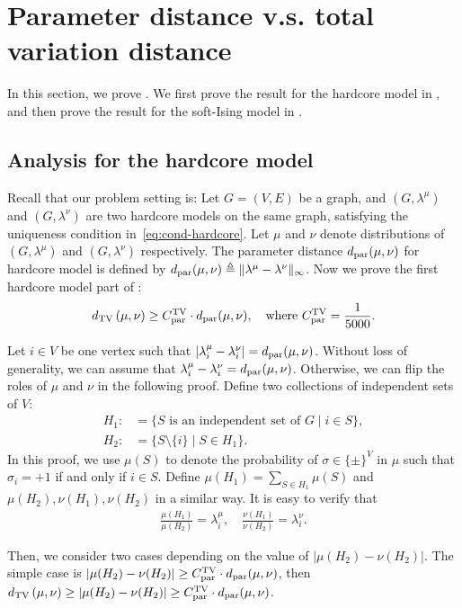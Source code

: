 \section{Parameter distance v.s. total variation distance}\label{sec:lower}
In this section, we prove . We first prove the result for the hardcore model in , and then prove the result for the soft-Ising model in . 
\subsection{Analysis for the hardcore model}\label{sec:hardcore-proof}
Recall that our problem setting is: Let $G=(V,E)$ be a graph, and $(G,\lambda^\mu)$ and $(G,\lambda^\nu)$ are two hardcore models on the same graph, satisfying the uniqueness condition in~\eqref{eq:cond-hardcore}. Let $\mu$ and $\nu$ denote distributions of $(G,\lambda^\mu)$ and $(G,\lambda^\nu)$ respectively. The parameter distance $d_\mathrm{par}(\mu,\nu)$ for hardcore model is defined by $d_\mathrm{par}(\mu,\nu) \triangleq \Vert \lambda^\mu - \lambda^\nu \Vert_{\infty}$.
%
Now we prove the first hardcore model part of : 
\[d_{\mathrm{TV}}\left({\mu},{\nu}\right) \geq C^\text{TV}_{\mathrm{par}}\cdot d_\mathrm{par}(\mu,\nu), \quad\text{where } C^\text{TV}_{\mathrm{par}} = \frac{1}{5000}.\]

Let $i \in V$ be one vertex such that $|\lambda_i^\mu-\lambda_i^\nu|=d_\mathrm{par}(\mu,\nu)$. Without loss of generality, we can assume that $\lambda_i^\mu-\lambda_i^\nu=d_\mathrm{par}(\mu,\nu)$. Otherwise, we can flip the roles of $\mu$ and $\nu$ in the following proof.
Define two collections of independent sets of $V$:
\begin{align*}
    H_1:&=\{S\text{ is an independent set of }G\mid i\in S\},\\
    H_2:&=\{S \setminus \{i\} \mid S \in H_1 \}.
\end{align*}
In this proof, we use $\mu(S)$ to denote the probability of $\sigma \in \{\pm\}^V$ in $\mu$ such that $\sigma_i = +1$ if and only if $i\in S$.
Define $\mu(H_1) = \sum_{S \in H_1} \mu(S)$ and $\mu(H_2),\nu(H_1),\nu(H_2)$ in a similar way.
It is easy to verify that 
\begin{align*}
\frac{\mu(H_1)}{\mu(H_2)}=\lambda_i^\mu ,\quad \frac{\nu(H_1)}{\nu(H_2)}=\lambda_i^\nu.
\end{align*}

Then, we consider two cases depending on the value of $|\mu(H_2)-\nu(H_2)|$. The simple case is $|\mu(H_2)-\nu(H_2)|\geq C^\text{TV}_{\mathrm{par}}\cdot d_\mathrm{par}(\mu,\nu)$, then $d_{\mathrm{TV}}\left({\mu},{\nu}\right) \geq|\mu(H_2)-\nu(H_2)|\geq C^\text{TV}_{\mathrm{par}}\cdot d_\mathrm{par}(\mu,\nu)$.

